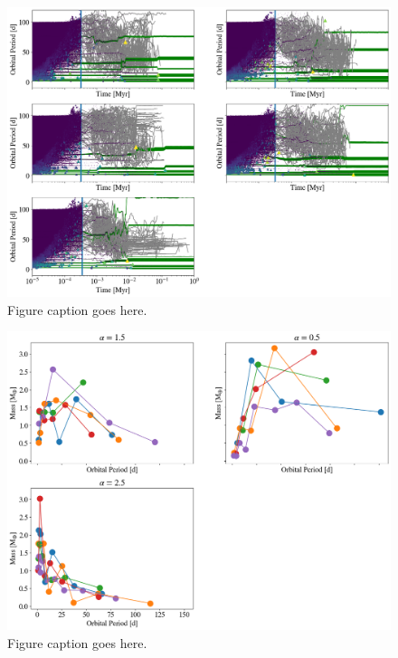 \begin{figure}
\begin{center}
    \includegraphics[width=\textwidth]{figures/stip/full_coll_evo.png}
    \caption{Figure caption goes here.\label{fig:full_coll_evo}}
\end{center}
\end{figure}

\begin{figure}
\begin{center}
    \includegraphics[width=\textwidth]{figures/stip/per_mass_full.png}
    \caption{Figure caption goes here.\label{fig:per_mass_full}}
\end{center}
\end{figure}

